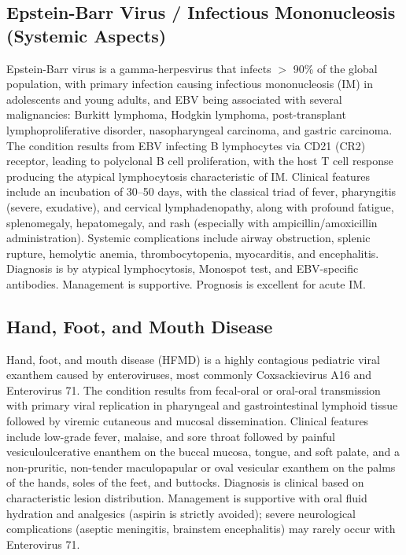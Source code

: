 \subsection{Epstein-Barr Virus / Infectious Mononucleosis (Systemic Aspects)}
\label{sec:Epstein-Barr Virus Systemic}
Epstein-Barr virus is a gamma-herpesvirus that infects $>$ 90\% of the global population, with primary infection causing infectious mononucleosis (IM) in adolescents and young adults, and EBV being associated with several malignancies: Burkitt lymphoma, Hodgkin lymphoma, post-transplant lymphoproliferative disorder, nasopharyngeal carcinoma, and gastric carcinoma. The condition results from EBV infecting B lymphocytes via CD21 (CR2) receptor, leading to polyclonal B cell proliferation, with the host T cell response producing the atypical lymphocytosis characteristic of IM. Clinical features include an incubation of 30--50 days, with the classical triad of fever, pharyngitis (severe, exudative), and cervical lymphadenopathy, along with profound fatigue, splenomegaly, hepatomegaly, and rash (especially with ampicillin/amoxicillin administration). Systemic complications include airway obstruction, splenic rupture, hemolytic anemia, thrombocytopenia, myocarditis, and encephalitis. Diagnosis is by atypical lymphocytosis, Monospot test, and EBV-specific antibodies. Management is supportive. Prognosis is excellent for acute IM.

\subsection{Hand, Foot, and Mouth Disease}
\label{sec:Hand, Foot, and Mouth Disease}
Hand, foot, and mouth disease (HFMD) is a highly contagious pediatric viral exanthem caused by enteroviruses, most commonly Coxsackievirus A16 and Enterovirus 71. The condition results from fecal-oral or oral-oral transmission with primary viral replication in pharyngeal and gastrointestinal lymphoid tissue followed by viremic cutaneous and mucosal dissemination. Clinical features include low-grade fever, malaise, and sore throat followed by painful vesiculoulcerative enanthem on the buccal mucosa, tongue, and soft palate, and a non-pruritic, non-tender maculopapular or oval vesicular exanthem on the palms of the hands, soles of the feet, and buttocks. Diagnosis is clinical based on characteristic lesion distribution. Management is supportive with oral fluid hydration and analgesics (aspirin is strictly avoided); severe neurological complications (aseptic meningitis, brainstem encephalitis) may rarely occur with Enterovirus 71.

